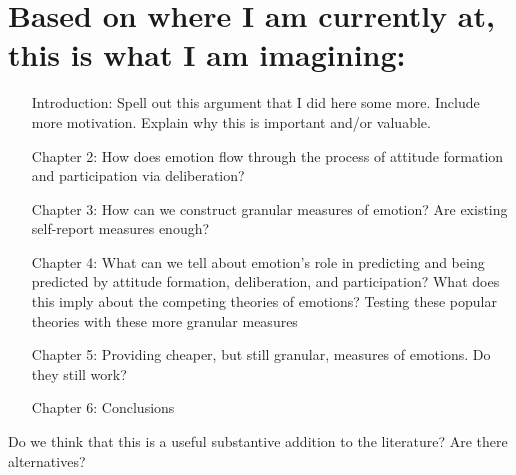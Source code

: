 \documentclass[12pt]{article}
\begin{document}
\section{Based on where I am currently at, this is what I am imagining:}
\begin{itemize}
    \item[Introduction:] Spell out this argument that I did here some more. Include more motivation. Explain why this is important and/or valuable.
    \item[Chapter 2:] How does emotion flow through the process of attitude formation and participation via deliberation?
    \item[Chapter 3:] How can we construct granular measures of emotion? Are existing self-report measures enough?
    \item[Chapter 4:] What can we tell about emotion's role in predicting and being predicted by attitude formation, deliberation, and participation? What does this imply about the competing theories of emotions? Testing these popular theories with these more granular measures
    \item[Chapter 5:] Providing cheaper, but still granular, measures of emotions. Do they still work? 
    \item[Chapter 6:] Conclusions
\end{itemize}

Do we think that this is a useful substantive addition to the literature? Are there alternatives?


\newpage 


\end{document}
